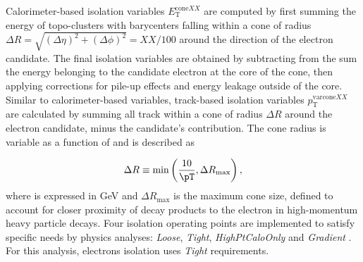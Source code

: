 \documentclass[../thesis.tex]{subfiles}
\begin{document}
Calorimeter-based isolation variables $E_\mathrm{T}^{\mathrm{cone}XX}$ are computed by first summing the energy of topo-clusters with barycenters falling within a cone of radius $\Delta R = \sqrt{(\Delta \eta)^2+(\Delta \phi)^2}=XX/100$ around the direction of the electron candidate. The final isolation variables are obtained by subtracting from the sum the energy belonging to the candidate electron at the core of the cone, then applying corrections for pile-up effects and energy leakage outside of the core. Similar to calorimeter-based variables, track-based isolation variables $p_\mathrm{T}^{\mathrm{varcone}XX}$ are calculated by summing all track \pT within a cone of radius $\Delta R$ around the electron candidate, minus the candidate's contribution. The cone radius is variable as a function of \pT and is described as

\begin{equation}
\Delta R \equiv \min \left(\frac{10}{\pT}, \Delta R_{\max} \right),
\end{equation}
where \pT is expressed in GeV and $\Delta R_{\max}$ is the maximum cone size, defined to account for closer proximity of decay products to the electron in high-momentum heavy particle decays. Four isolation operating points are implemented to satisfy specific needs by physics analyses: \textit{Loose}, \textit{Tight}, \textit{HighPtCaloOnly} and \textit{Gradient} \citep{reco:electron_id}. For this analysis, electrons isolation uses \textit{Tight} requirements.

\end{document}

